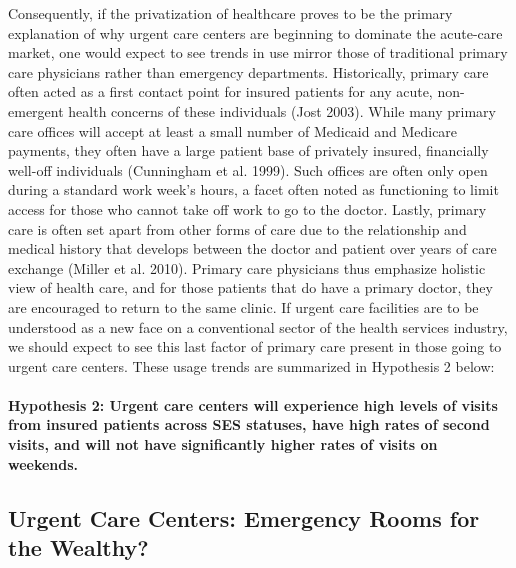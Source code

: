 \documentclass[12pt,twoside]{reedthesis}
\begin{document}
  Consequently, if the privatization of healthcare proves to be the
  primary explanation of why urgent care centers are beginning to dominate
  the acute-care market, one would expect to see trends in use mirror
  those of traditional primary care physicians rather than emergency
  departments. Historically, primary care often acted as a first contact
  point for insured patients for any acute, non-emergent health concerns
  of these individuals (Jost 2003). While many primary care offices will
  accept at least a small number of Medicaid and Medicare payments, they
  often have a large patient base of privately insured, financially
  well-off individuals (Cunningham et al. 1999). Such offices are often
  only open during a standard work week's hours, a facet often noted as
  functioning to limit access for those who cannot take off work to go to
  the doctor. Lastly, primary care is often set apart from other forms of
  care due to the relationship and medical history that develops between
  the doctor and patient over years of care exchange (Miller et al. 2010).
  Primary care physicians thus emphasize holistic view of health care, and
  for those patients that do have a primary doctor, they are encouraged to
  return to the same clinic. If urgent care facilities are to be
  understood as a new face on a conventional sector of the health services
  industry, we should expect to see this last factor of primary care
  present in those going to urgent care centers. These usage trends are
  summarized in Hypothesis 2 below:
  
  \paragraph{Hypothesis 2: Urgent care centers will experience high levels
  of visits from insured patients across SES statuses, have high rates of
  second visits, and will not have significantly higher rates of visits on
  weekends.}\label{hypothesis-2-urgent-care-centers-will-experience-high-levels-of-visits-from-insured-patients-across-ses-statuses-have-high-rates-of-second-visits-and-will-not-have-significantly-higher-rates-of-visits-on-weekends.}
  
  \subsection*{Urgent Care Centers: Emergency Rooms for the
  Wealthy?}\label{urgent-care-centers-emergency-rooms-for-the-wealthy}
  
\end{document}
